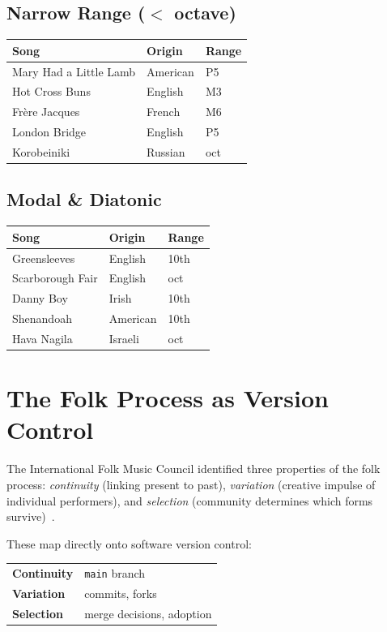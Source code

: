\documentclass[10pt,letterpaper,twocolumn]{article}
\begin{document}
\subsection{Narrow Range ($<$ octave)}

\begin{tabularx}{\linewidth}{XXX}
\toprule
\textbf{Song} & \textbf{Origin} & \textbf{Range} \\
\midrule
Mary Had a Little Lamb & American & P5 \\
Hot Cross Buns & English & M3 \\
Fr\`ere Jacques & French & M6 \\
London Bridge & English & P5 \\
Korobeiniki & Russian & oct \\
\bottomrule
\end{tabularx}

\subsection{Modal \& Diatonic}

\begin{tabularx}{\linewidth}{XXX}
\toprule
\textbf{Song} & \textbf{Origin} & \textbf{Range} \\
\midrule
Greensleeves & English & 10th \\
Scarborough Fair & English & oct \\
Danny Boy & Irish & 10th \\
Shenandoah & American & 10th \\
Hava Nagila & Israeli & oct \\
\bottomrule
\end{tabularx}

\section{The Folk Process as Version Control}

The International Folk Music Council identified three properties of the folk process: \emph{continuity} (linking present to past), \emph{variation} (creative impulse of individual performers), and \emph{selection} (community determines which forms survive)~\citep{karpeles1955definition}.

These map directly onto software version control:

\vspace{0.3em}
\begin{tabularx}{\linewidth}{XX}
\textbf{Continuity} & \texttt{main} branch \\
\textbf{Variation} & commits, forks \\
\textbf{Selection} & merge decisions, adoption \\
\end{tabularx}
\vspace{0.3em}
\end{document}
